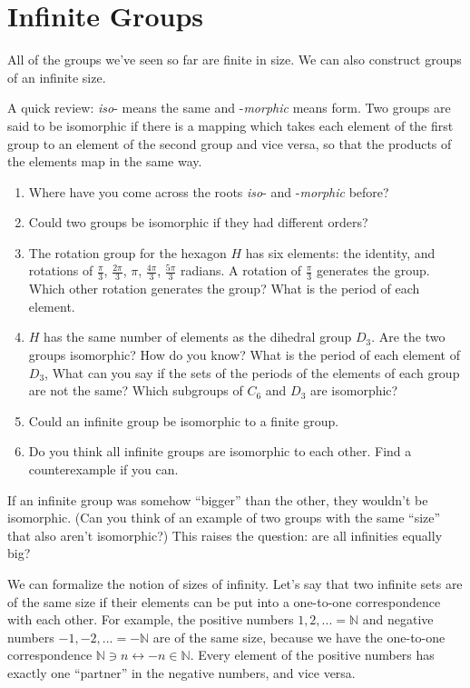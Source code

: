 \documentclass[../gatm.tex]{subfiles}
\begin{document}
\section{Infinite Groups}


All of the groups we've seen so far are finite in size. We can also construct groups of an infinite size.

A quick review: \textit{iso}- means the same and -\textit{morphic} means form. Two groups are said to be isomorphic if there is a mapping which takes each element of the first group to an element of the second group and vice versa, so that the products of the elements map in the same way.

\begin{enumerate}
\item Where have you come across the roots \textit{iso}- and -\textit{morphic} before?
\item Could two groups be isomorphic if they had different orders?
\item The rotation group for the hexagon $H$ has six elements: the identity, and rotations of $\frac{\pi}{3}$, $\frac{2\pi}{3}$, $\pi$, $\frac{4\pi}{3}$, $\frac{5\pi}{3}$ radians. A rotation of $\frac{\pi}{3}$ generates the group. Which other rotation generates the group? What is the period of each element.
\item $H$ has the same number of elements as the dihedral group $D_3$. Are the two groups isomorphic? How do you know? What is the period of each element of $D_3$, What can you say if the sets of the periods of the elements of each group are not the same? Which subgroups of $C_6$ and $D_3$ are isomorphic?
\item Could an infinite group be isomorphic to a finite group.
\item Do you think all infinite groups are isomorphic to each other. Find a counterexample if you can.
\setcounter{problem_i}{\value{enumi}}
\end{enumerate}

If an infinite group was somehow ``bigger'' than the other, they wouldn't be isomorphic. (Can you think of an example of two groups with the same ``size'' that also aren't isomorphic?) This raises the question: are all infinities equally big?

We can formalize the notion of sizes of infinity. Let's say that two infinite sets are of the same size if their elements can be put into a one-to-one correspondence with each other. For example, the positive numbers ${1,2,...}=\mathbb{N}$ and negative numbers ${-1,-2,...}=-\mathbb{N}$ are of the same size, because we have the one-to-one correspondence $\mathbb{N} \ni n\leftrightarrow -n \in \mathbb{N}$. Every element of the positive numbers has exactly one ``partner'' in the negative numbers, and vice versa.
\end{document}
